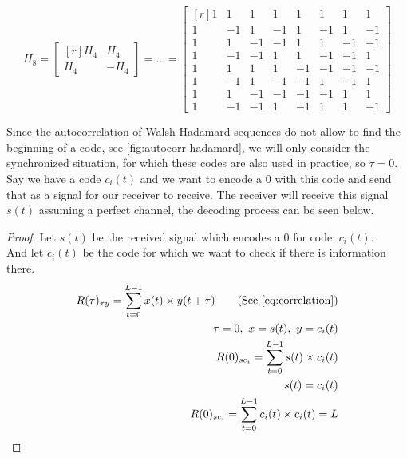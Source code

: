 			\begin{equation}
				H_8 = 
				\begin{bmatrix*}[r] 
					H_4 & H_4 \\ 
					H_4 & -H_4 
				\end{bmatrix*}
				=
				\dotsc
				=
				\begin{bmatrix*}[r]
					1	&	 1	&	 1	&	 1	&	 1	&	 1	&	 1	&	 1 \\
					1	&	-1	&	 1	&	-1	&	 1	&	-1	&	 1	&	-1 \\
					1	&	 1	&	-1	&	-1	&	 1	&	 1	&	-1	&	-1 \\
					1	&	-1	&	-1	&	 1	&	 1	&	-1	&	-1	&	 1 \\
					1	&	 1	&	 1	&	 1	&	-1	&	-1	&	-1	&	-1 \\
					1	&	-1	&	 1	&	-1	&	-1	&	 1	&	-1	&	 1 \\
					1	&	 1	&	-1	&	-1	&	-1	&	-1	&	 1	&	 1 \\
					1	&	-1	&	-1	&	 1	&	-1	&	 1	&	 1	&	-1 
				\end{bmatrix*}
				\label{matrix:h8}
			\end{equation}

		Since the autocorrelation of Walsh-Hadamard sequences do not allow to find the beginning of a code, see \autoref{fig:autocorr-hadamard}, we will only consider the synchronized situation, for which these codes are also used in practice, so $\tau = 0$.
		Say we have a code $c_i(t)$ and we want to encode a $0$ with this code and send that as a signal for our receiver to receive.
		The receiver will receive this signal $s(t)$ assuming a perfect channel, the decoding process can be seen below.


		\begin{proof}
			Let $s(t)$ be the received signal which encodes a 0 for code: $c_i(t)$.\\
			And let $c_i(t)$ be the code for which we want to check if there is information there. \\

			\begin{align*}
				R(\tau)_{xy} = \displaystyle\sum_{t = 0} ^ {L - 1} x(t) \times y(t + \tau)	\tag{See \autoref{eq:correlation}}
				\\ \tau = 0,\ x = s(t),\ y = c_i(t)	
				\\ R(0)_{sc_{i}} = \displaystyle\sum_{t = 0} ^ {L - 1} s(t) \times c_i(t)	
				\\ s(t) = c_i(t)															
				\\ R(0)_{sc_{i}} = \displaystyle\sum_{t = 0} ^ {L - 1} c_i(t) \times c_i(t) = L
			\end{align*}

		\end{proof}

